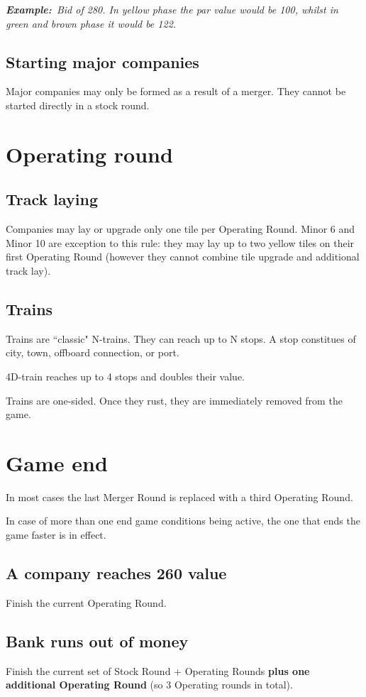 \documentclass[10pt,a4paper,twocolumn]{article}
\newcommand{\Example}{\textbf{Example:}}
\begin{document}
\textit{\Example~Bid of 280. In yellow phase the par value would be 100, whilst in green and brown phase it would be 122.}

\subsection{Starting major companies}
Major companies may only be formed as a result of a merger. They cannot be started directly in a stock round.


\section{Operating round}

\subsection{Track laying}
Companies may lay or upgrade only one tile per Operating Round. Minor 6 and Minor 10 are exception to this rule: they may lay up to two yellow tiles on their first Operating Round (however they cannot combine tile upgrade and additional track lay).


\subsection{Trains}
Trains are ``classic" N-trains. They can reach up to N stops. A stop constitues of city, town, offboard connection, or port.

4D-train reaches up to 4 stops and doubles their value.

Trains are one-sided. Once they rust, they are immediately removed from the game.


\section{Game end}

In most cases the last Merger Round is replaced with a third Operating Round.

In case of more than one end game conditions being active, the one that ends the game faster is in effect.

\subsection{A company reaches 260 value}
Finish the current Operating Round.

\subsection{Bank runs out of money}
Finish the current set of Stock Round + Operating Rounds \textbf{plus one additional Operating Round} (so 3 Operating rounds in total).
\end{document}
